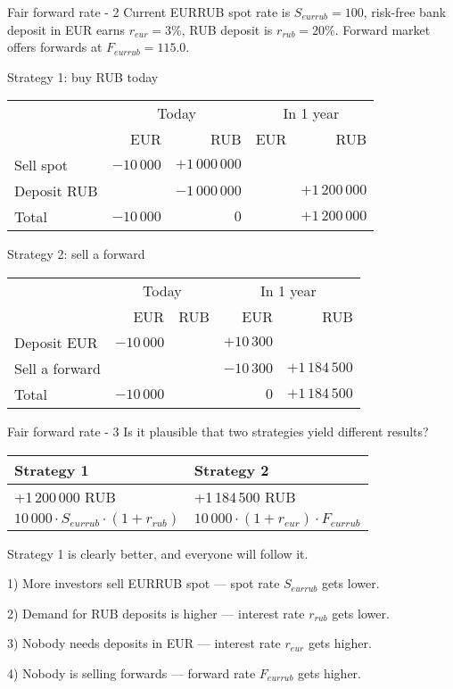 \documentclass{beamer}
\begin{document}
\begin{frame}{Fair forward rate - 2}
\justify
Current EURRUB spot rate is $S_{eurrub}=100$, risk-free bank deposit in EUR earns $r_{eur}=3\%$, RUB deposit is $r_{rub}=20\%$. 
Forward market offers forwards at $F_{eurrub}=115.0$.

\justify
Strategy 1: buy RUB today

\centering
\begin{tabular}{l|r|r|r|r}
& \multicolumn{2}{c|}{Today} & \multicolumn{2}{c}{In 1 year} \\ \cline{2-5}
& EUR & RUB & EUR & RUB \\ \hline
Sell spot & $-10\,000$ & $+1\,000\,000$ & & \\
Deposit RUB & & $-1\,000\,000$ & & $+1\,200\,000$ \\ \hline
Total & $-10\,000$ & $0$ & & $+1\,200\,000$
\end{tabular}

\justify
Strategy 2: sell a forward

\centering
\begin{tabular}{l|r|r|r|r}
& \multicolumn{2}{c|}{Today} & \multicolumn{2}{c}{In 1 year} \\ \cline{2-5}
& EUR & RUB & EUR & RUB \\ \hline
Deposit EUR & $-10\,000$ & & $+10\,300$ & \\
Sell a forward &   &   & $-10\,300$ & $+1\,184\,500$ \\ \hline
Total & $-10\,000$ &   & $0$ & $+1\,184\,500$
\end{tabular}

\end{frame}



\begin{frame}{Fair forward rate - 3}
\justify
Is it plausible that two strategies yield different results?

\justify
\centering
\begin{tabular}{l|l}
Strategy 1 & Strategy 2 \\ \hline
+1\,200\,000 RUB  & +1\,184\,500 RUB \\
$10\,000 \cdot S_{eurrub} \cdot (1+r_{rub})$ & $10\,000 \cdot (1+r_{eur}) \cdot F_{eurrub}$
\end{tabular}

\justify
Strategy 1 is clearly better, and everyone will follow it. 

1) More investors sell EURRUB spot --- spot rate $S_{eurrub}$ gets lower.

2) Demand for RUB deposits is higher --- interest rate $r_{rub}$ gets lower.

3) Nobody needs deposits in EUR --- interest rate $r_{eur}$ gets higher. 

4) Nobody is selling forwards --- forward rate $F_{eurrub}$ gets higher.
\end{frame}
\end{document}
